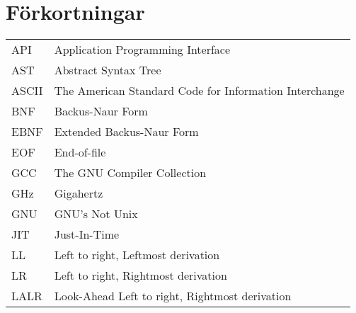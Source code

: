 \section*{Förkortningar}

\begin{tabular}{l l}
  API & Application Programming Interface \\
  AST & Abstract Syntax Tree \\
  ASCII & The American Standard Code for Information Interchange \\
  BNF & Backus-Naur Form \\
  EBNF & Extended Backus-Naur Form \\
  EOF & End-of-file \\
  GCC & The GNU Compiler Collection \\
  GHz & Gigahertz \\
  GNU & GNU's Not Unix \\
  JIT & Just-In-Time \\
  LL & Left to right, Leftmost derivation \\
  LR & Left to right, Rightmost derivation \\
  LALR & Look-Ahead Left to right, Rightmost derivation
\end{tabular}

\clearpage
